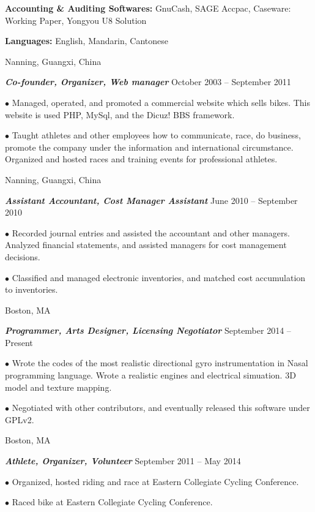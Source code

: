 \documentclass[10pt]{article}
\begin{document}
\noindent
{\bf Accounting \& Auditing Softwares:} GnuCash, SAGE Accpac, Caseware: Working Paper, Yongyou U8 Solution

\noindent
{\bf Languages:} English, Mandarin, Cantonese

\medskip


  \hfill Nanning, Guangxi, China

\noindent \textit{\textbf{Co-founder, Organizer, Web manager}} \hfill October 2003 -- September 2011

\hangindent=0.7cm $\bullet$ Managed, operated, and promoted a commercial website which sells bikes. This website is used PHP, MySql, and the Dicuz! BBS framework.

\hangindent=0.7cm $\bullet$ Taught athletes and other employees how to communicate, race, do business, promote the company under the information and international circumstance. Organized and hosted races and training events for professional athletes.

\medskip

 \hfill Nanning, Guangxi, China

\noindent \textit{\textbf{Assistant Accountant, Cost Manager Assistant}} \hfill June 2010 -- September 2010

\hangindent=0.7cm $\bullet$ Recorded journal entries and assisted the accountant and other managers. Analyzed financial statements, and assisted managers for cost management decisions.

\hangindent=0.7cm $\bullet$ Classified and managed electronic inventories, and matched cost accumulation to inventories.

\medskip


 \hfill Boston, MA

\noindent \textit{\textbf{Programmer, Arts Designer, Licensing Negotiator}} \hfill September 2014 -- Present

\hangindent=0.7cm $\bullet$ Wrote the codes of the most realistic directional gyro instrumentation in Nasal programming language. Wrote a realistic engines and electrical simuation. 3D model and texture mapping.

\hangindent=0.7cm $\bullet$ Negotiated with other contributors, and eventually released this software under GPLv2.

\medskip

 \hfill Boston, MA

\noindent \textit{\textbf{Athlete, Organizer, Volunteer}} \hfill September 2011 -- May 2014

\hangindent=0.7cm $\bullet$ Organized, hosted riding and race at Eastern Collegiate Cycling Conference.

\hangindent=0.7cm $\bullet$ Raced bike at Eastern Collegiate Cycling Conference.
\end{document}
